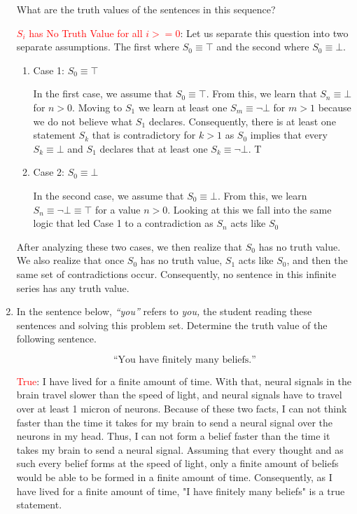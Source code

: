 \documentclass{article}
\begin{document}
\begin{enumerate}
    What are the truth values of the sentences in this sequence?

    \textcolor{red}{$S_i$ has No Truth Value for all $i >= 0$}: Let us separate this question into two separate assumptions. The first where $S_0\equiv\top$ and the second where $S_0\equiv\bot$.

    \begin{enumerate}
        \item Case 1: $S_0\equiv\top$

        In the first case, we assume that $S_0\equiv\top$. From this, we learn that $S_n\equiv\bot$ for $n > 0$. Moving to $S_1$ we learn at least one $S_m\equiv\neg\bot$ for $m > 1$ because we do not believe what $S_1$ declares. Consequently, there is at least one statement $S_k$ that is contradictory for  $k > 1$ as $S_0$ implies that every $S_k\equiv\bot$ and $S_1$ declares that at least one $S_k\equiv\neg\bot$. T
        \item Case 2: $S_0\equiv\bot$
        
        In the second case, we assume that $S_0\equiv\bot$. From this, we learn $S_n\equiv\neg\bot\equiv\top$ for a value $n > 0$.  Looking at this we fall into the same logic that led Case 1 to a contradiction as $S_n$ acts like $S_0$
    \end{enumerate}
    After analyzing these two cases, we then realize that $S_0$ has no truth value. We also realize that once $S_0$ has no truth value, $S_1$ acts like $S_0$, and then the same set of contradictions occur. Consequently, no sentence in this infinite series has any truth value.
\vspace{0.5in}
    \item
    In the sentence below, \emph{``you''} refers to \emph{you}\emph{,} the student reading these sentences and solving this problem set.
    Determine the truth value of the following sentence.
    
    \begin{equation*}
      \text{``You have finitely many beliefs.''}
    \end{equation*}
    
    \textcolor{red}{True}: I have lived for a finite amount of time. With that, neural signals in the brain travel slower than the speed of light, and neural signals have to travel over at least 1 micron of neurons. Because of these two facts, I can not think faster than the time it takes for my brain to send a neural signal over the neurons in my head. Thus, I can not form a belief faster than the time it takes my brain to send a neural signal. Assuming that every thought and as such every belief forms at the speed of light, only a finite amount of beliefs would be able to be formed in a finite amount of time. Consequently, as I have lived for a finite amount of time, "I have finitely many beliefs" is a true statement.
\end{enumerate}
\end{document}
